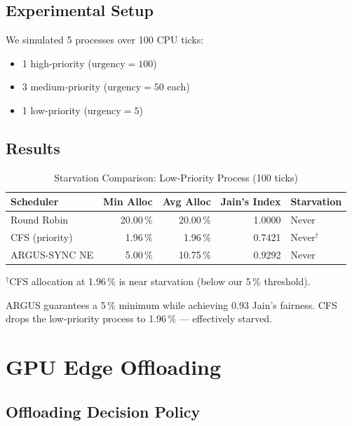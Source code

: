 \documentclass[sigconf]{acmart}
\begin{document}
\subsection{Experimental Setup}

We simulated 5 processes over 100 CPU ticks:
\begin{itemize}
  \item 1 high-priority ($\text{urgency}=100$)
  \item 3 medium-priority ($\text{urgency}=50$ each)
  \item 1 low-priority ($\text{urgency}=5$)
\end{itemize}

\subsection{Results}

\begin{table}[h]
\centering
\caption{Starvation Comparison: Low-Priority Process (100 ticks)}
\label{tab:starvation}
\begin{tabular}{@{}lrrrl@{}}
\toprule
Scheduler & Min Alloc & Avg Alloc & Jain's Index & Starvation \\
\midrule
Round Robin     & 20.00\,\% & 20.00\,\% & 1.0000 & Never \\
CFS (priority)  &  1.96\,\% &  1.96\,\% & 0.7421 & Never$^\dagger$ \\
ARGUS-SYNC NE   &  5.00\,\% & 10.75\,\% & 0.9292 & Never \\
\bottomrule
\end{tabular}
\vspace{4pt}
\small $^\dagger$CFS allocation at 1.96\,\% is near starvation (below our 5\,\% threshold).
\end{table}

ARGUS guarantees a 5\,\% minimum while achieving 0.93 Jain's fairness.
CFS drops the low-priority process to 1.96\,\% — effectively starved.

\section{GPU Edge Offloading}
\label{sec:gpu}

\subsection{Offloading Decision Policy}
\end{document}
